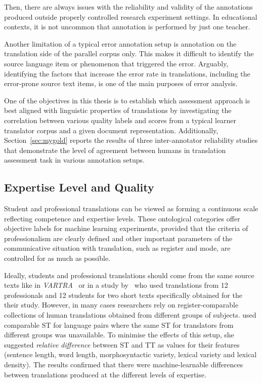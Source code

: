 Then, there are always issues with the reliability and validity of the annotations produced outside properly controlled research experiment settings. In educational contexts, it is not uncommon that annotation is performed by just one teacher. 

Another limitation of a typical error annotation setup is annotation on the translation side of the parallel corpus only. This makes it difficult to identify the source language item or phenomenon that triggered the error. Arguably, identifying the factors that increase the error rate in translations, including the error-prone source text items, is one of the main purposes of error analysis.

One of the objectives in this thesis is to establish which assessment approach is best aligned with linguistic properties of translations by investigating the correlation between various quality labels and scores from a typical learner translator corpus and a given document representation. 
Additionally, Section~\ref{sec:mygold} reports the results of three inter-annotator reliability studies that demonstrate the level of agreement between humans in translation assessment task in various annotation setups. %

\subsection{\label{ssec:pro}Expertise Level and Quality}
Student and professional translations can be viewed as forming a continuous scale reflecting competence and expertise levels. These ontological categories offer objective labels for machine learning experiments, provided that the criteria of professionalism are clearly defined and other important parameters of the communicative situation with translation, such as register and mode, are controlled for as much as possible. 

Ideally, students and professional translations should come from the same source texts like in \textit{VARTRA}~\cite{Lapshinova2013} or in a study by~\citet{Carl2010} who used translations from 12 professionals and 12 students for two short texts specifically obtained for the their study. However, in many cases researchers rely on register-comparable collections of human translations obtained from different groups of subjects. \citet{Popovic2020} used comparable ST for language pairs where the same ST for translators from different groups was unavailable. To minimise the effects of this setup, she suggested \textit{relative difference} between ST and TT as values for their features (sentence length, word length, morphosyntactic variety, lexical variety and lexical density). The results confirmed that there were machine-learnable differences between translations produced at the different levels of expertise.


